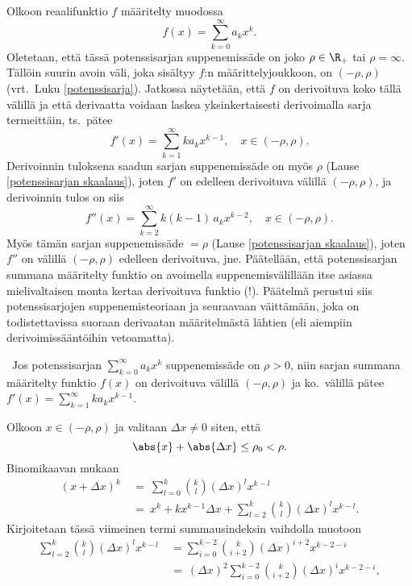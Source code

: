 Olkoon reaalifunktio $f$ määritelty muodossa
\[
f(x) = \sum_{k=0}^\infty a_k x^k.
\]
Oletetaan, että tässä potenssisarjan suppenemissäde on joko $\rho\in\R_+$ tai $\rho=\infty$.
Tällöin suurin avoin väli, joka sisältyy $f$:n määrittelyjoukkoon, on $(-\rho,\rho)$
(vrt.\ Luku \ref{potenssisarja}). Jatkossa näytetään, että $f$ on derivoituva koko tällä
välillä ja että derivaatta voidaan laskea yksinkertaisesti derivoimalla sarja termeittäin,
ts.\ pätee
\[
f'(x) = \sum_{k=1}^\infty k a_k x^{k-1}, \quad x \in (-\rho,\rho).
\]
Derivoinnin tuloksena saadun sarjan suppenemissäde on myös $\rho$ (Lause
\ref{potenssisarjan skaalaus}), joten $f'$ on edelleen derivoituva välillä $(-\rho,\rho)$,
ja derivoinnin tulos on siis
\[
f''(x) = \sum_{k=2}^\infty k(k-1)\,a_k x^{k-2}, \quad x \in (-\rho,\rho).
\]
Myös tämän sarjan suppenemissäde $=\rho$ (Lause \ref{potenssisarjan skaalaus}),
joten $f''$ on välillä $(-\rho,\rho)$ edelleen derivoituva, jne. Päätellään, että
potenssisarjan summana määritelty funktio on avoimella suppenemisvälillään itse asiassa
mielivaltaisen monta kertaa derivoituva funktio (!). Päätelmä perustui siis potenssisarjojen
suppenemisteoriaan ja seuraavaan väittämään, joka on todistettavissa suoraan derivaatan
määritelmästä lähtien (eli aiempiin derivoimissääntöihin vetoamatta).
\begin{Lause} \label{potenssisarja on derivoituva} \,
Jos potenssisarjan $\sum_{k=0}^\infty a_k x^k$ suppenemissäde on $\rho>0$, niin sarjan summana 
määritelty funktio $f(x)$ on derivoituva välillä $(-\rho,\rho)$ ja ko.\ välillä pätee 
$f'(x)=\sum_{k=1}^\infty k a_k x^{k-1}$. 
\end{Lause}
\tod Olkoon $x\in (-\rho,\rho)$ ja valitaan $\Delta x \neq 0$ siten, että
\[
\abs{x}+\abs{\Delta x} \le \rho_0<\rho.
\]
Binomikaavan mukaan
\begin{align*}
(x+\Delta x)^k\ &=\ \sum_{l=0}^k \binom{k}{l} (\Delta x)^l x^{k-l} \\
                &=\ x^k + kx^{k-1}\Delta x + \sum_{l=2}^k \binom{k}{l} (\Delta x)^l x^{k-l}.
\end{align*}
Kirjoitetaan tässä viimeinen termi summausindeksin vaihdolla muotoon
\begin{align*}
\sum_{l=2}^k \binom{k}{l} (\Delta x)^l x^{k-l}\ 
              &= \sum_{i=0}^{k-2} \binom{k}{i+2} (\Delta x)^{i+2} x^{k-2-i} \\
              &=\ (\Delta x)^2 \sum_{i=0}^{k-2} \binom{k}{i+2} (\Delta x)^i x^{k-2-i},
\end{align*}
